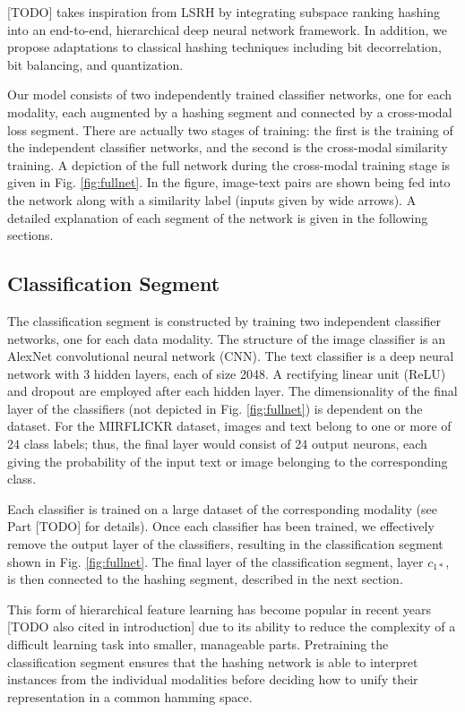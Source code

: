 \documentclass[letterpaper]{article}
\begin{document}
[TODO] takes inspiration from LSRH by integrating subspace ranking hashing into an end-to-end, hierarchical deep neural network framework. In addition, we propose adaptations to classical hashing techniques including bit decorrelation, bit balancing, and quantization.

Our model consists of two independently trained classifier networks, one for each modality, each augmented by a hashing segment and connected by a cross-modal loss segment. There are actually two stages of training: the first is the training of the independent classifier networks, and the second is the cross-modal similarity training. A depiction of the full network during the cross-modal training stage is given in Fig. \ref{fig:fullnet}. In the figure, image-text pairs are shown being fed into the network along with a similarity label (inputs given by wide arrows). A detailed explanation of each segment of the network is given in the following sections. 

\subsection{Classification Segment}

The classification segment is constructed by training two independent classifier networks, one for each data modality. The structure of the image classifier is an AlexNet \cite{alexnet} convolutional neural network (CNN). The text classifier is a deep neural network with 3 hidden layers, each of size 2048. A rectifying linear unit (ReLU) and dropout are employed after each hidden layer. The dimensionality of the final layer of the classifiers (not depicted in Fig. \ref{fig:fullnet}) is dependent on the dataset. For the MIRFLICKR \cite{flickr} dataset, images and text belong to one or more of 24 class labels; thus, the final layer would consist of 24 output neurons, each giving the probability of the input text or image belonging to the corresponding class.

Each classifier is trained on a large dataset of the corresponding modality (see Part [TODO] for details). Once each classifier has been trained, we effectively remove the output layer of the classifiers, resulting in the classification segment shown in Fig. \ref{fig:fullnet}. The final layer of the classification segment, layer $ c_{1*} $, is then connected to the hashing segment, described in the next section.

This form of hierarchical feature learning has become popular in recent years \cite{dvsh,dcmh,autoen,chn,cdq} [TODO also cited in introduction] due to its ability to reduce the complexity of a difficult learning task into smaller, manageable parts. Pretraining the classification segment ensures that the hashing network is able to interpret instances from the individual modalities before deciding how to unify their representation in a common hamming space.
\end{document}
